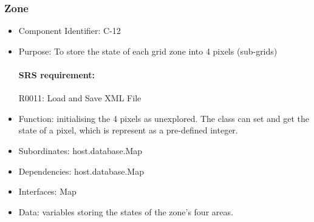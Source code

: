 \documentclass[11pt, a4paper]{report}
\begin{document}
\subsubsection{Zone}
\begin{itemize}
\item Component Identifier: C-12
\item Purpose: To store the state of each grid zone into 4 pixels (sub-grids)
\paragraph{SRS requirement:} R0011: Load and Save XML File
\item Function: initialising the 4 pixels as unexplored. The class can set and get the state
of a pixel, which is represent as a pre-defined integer.
\item Subordinates: host.database.Map
\item Dependencies: host.database.Map
\item Interfaces: Map
\item Data: variables storing the states of the zone's four areas.
\end{itemize}

\end{document}
